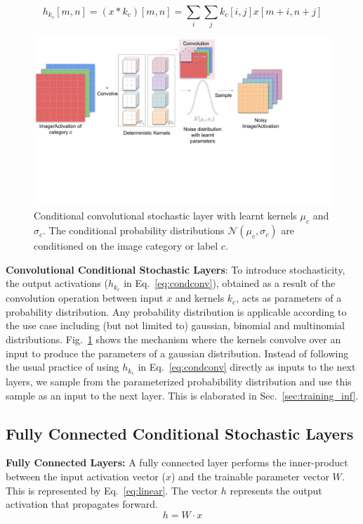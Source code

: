 \documentclass[12pt, letterpaper]{article}
\begin{document}
\begin{equation}
  h_{k_c}[m,n]=(x * k_c)[m,n]=\sum_i \sum_j k_c[i,j]x[m+i,n+j]
  \label{eq:condconv}
\end{equation}
\begin{figure}[t]
    \centering
    \includegraphics[width=\textwidth, trim={0 5cm 2.5cm 0}, clip]{Conditional noise layer.pdf}
    \caption{Conditional convolutional stochastic layer with learnt kernels $\mu_c$ and $\sigma_c$. The conditional probability distributions $\mathcal{N}(\mu_c, \sigma_c)$ are conditioned on the image category or label $c$.}
    \label{fig:condconv}
\end{figure}

\noindent \textbf{Convolutional Conditional Stochastic Layers}:
To introduce stochasticity, the output activations ($h_{k_c}$ in Eq.~\eqref{eq:condconv}), obtained as a result of the convolution operation between input $x$ and kernels $k_c$, acts as parameters of a probability distribution. 
Any probability distribution is applicable according to the use case including (but not limited to) gaussian, binomial and multinomial distributions.  
Fig.~\ref{fig:condconv} shows the mechanism where the kernels convolve over an input to produce the parameters of a gaussian distribution. Instead of following the usual practice of using $h_{k_c}$ in Eq.~\eqref{eq:condconv} directly as inputs to the next layers, we sample from the parameterized probabibility distribution and use this sample as an input to the next layer. This is elaborated in Sec.~\ref{sec:training_inf}.

\subsection{Fully Connected Conditional Stochastic Layers}
\textbf{Fully Connected Layers:} A fully connected layer performs the inner-product between the input activation vector ($x$) and the trainable parameter vector $W$.
This is represented by Eq.~\eqref{eq:linear}. The vector $h$ represents the output activation that propagates forward.
\begin{equation}
h=W \cdot x
    \label{eq:linear}
\end{equation}
\end{document}
